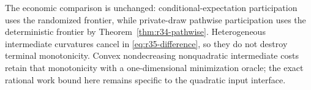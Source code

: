 The economic comparison is unchanged: conditional-expectation participation uses the randomized frontier, while private-draw pathwise participation uses the deterministic frontier by Theorem~\ref{thm:r34-pathwise}. Heterogeneous intermediate curvatures cancel in \eqref{eq:r35-difference}, so they do not destroy terminal monotonicity. Convex nondecreasing nonquadratic intermediate costs retain that monotonicity with a one-dimensional minimization oracle; the exact rational work bound here remains specific to the quadratic input interface.

